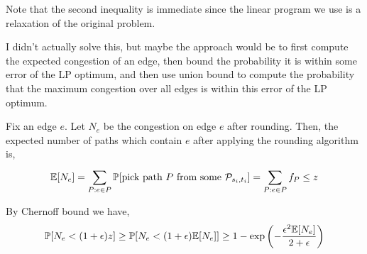 \documentclass[10pt]{article}
\begin{document}
\begin{solution}[Solution]
\begin{enumerate}[label=(\alph*)]
        Note that the second inequality is immediate since the linear program we use is a relaxation of the original problem.

        I didn't actually solve this, but maybe the approach would be to first compute the expected congestion of an edge, then bound the probability it is within some error of the LP optimum, and then use union bound to compute the probability that the maximum congestion over all edges is within this error of the LP optimum.

        Fix an edge \( e \). Let \( N_e \) be the congestion on edge \( e \) after rounding. Then, the expected number of paths which contain \( e \) after applying the rounding algorithm is,
        \begin{align*}
            \mathbb{E}[N_e]
            = \sum_{P : e\in P}^{} \mathbb{P}[\text{pick path }P\text{ from some }\mathcal{P}_{s_i,t_i}]
            = \sum_{P:e\in P}^{} f_P
            \leq z
        \end{align*}

        By Chernoff bound we have,
        \begin{align*}
            \mathbb{P}[N_e < (1+\epsilon) z] 
            \geq \mathbb{P}[ N_e < (1+\epsilon) \mathbb{E}[N_e]] 
            \geq 1 - \exp \left( -\frac{\epsilon^2 \mathbb{E}[N_e]}{2+\epsilon} \right)
        \end{align*}
    



\end{enumerate}
\end{solution}
\end{document}
